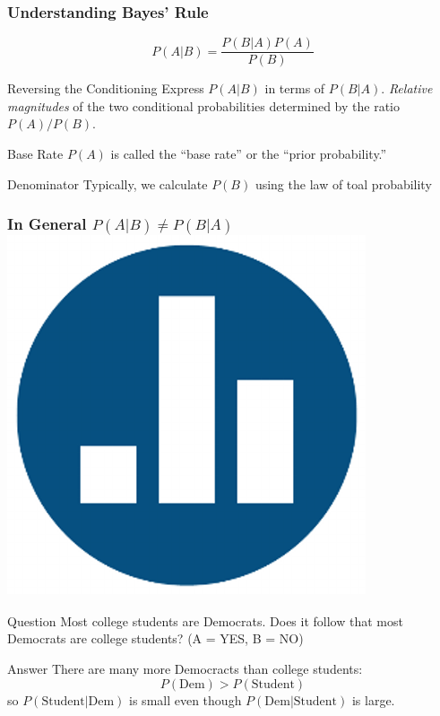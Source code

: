 \documentclass[handout]{beamer}
\begin{document}
\begin{frame}
\frametitle{Understanding Bayes' Rule}
$$\boxed{P(A|B) = \frac{P(B|A)P(A)}{P(B)}}$$

\begin{block}
	{Reversing the Conditioning}
	Express $P(A|B)$ in terms of $P(B|A)$. \emph{Relative magnitudes} of the two conditional probabilities determined by the ratio $P(A)/P(B)$.
\end{block}

\begin{block}
	{Base Rate}
	$P(A)$ is called the ``base rate'' or the ``prior probability.'' 
\end{block}

\begin{block}
	{Denominator}
	Typically, we calculate $P(B)$ using the law of toal probability
\end{block}


\end{frame}
\begin{frame}
\frametitle{In General $P(A|B) \neq P(B|A)$ \hfill \includegraphics[scale = 0.05]{./images/clicker}} 
\begin{block}{Question}
Most college students are Democrats. Does it follow that most Democrats are college students?  \hfill  \alert{(A = YES, B = NO)}
\end{block}

\pause

\begin{block}{Answer}
There are many more Democracts than college students: 
$$P(\mbox{Dem}) > P(\mbox{Student})$$ 
so $P(\mbox{Student}|\mbox{Dem})$ is small even though $P(\mbox{Dem}|\mbox{Student})$ is large.
\end{block}
\end{frame}
\end{document}
